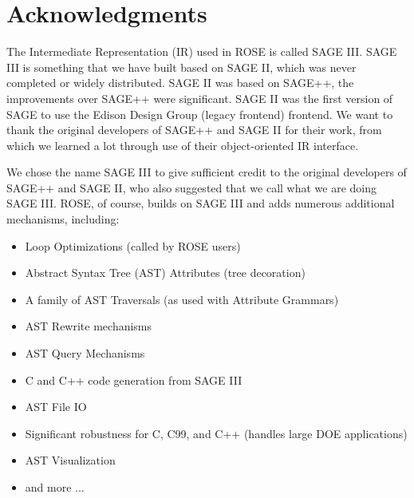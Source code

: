 
\chapter*{Acknowledgments}

% 
% 

   The Intermediate Representation (IR) used in ROSE is called SAGE III.
SAGE III is something that we have built based on SAGE II, which was never 
completed or widely distributed. SAGE II was based on SAGE++, the improvements 
over SAGE++ were significant. SAGE II was the first version of SAGE to use the 
Edison Design Group (legacy frontend) frontend.  We want to thank the original
developers of SAGE++ and SAGE II for their work, from which we learned a lot
through use of their object-oriented IR interface.

   We chose the name SAGE III to give sufficient credit to the original developers
of SAGE++ and SAGE II, who also suggested that we call what we are doing SAGE III.  
ROSE, of course, builds on SAGE III and adds numerous additional mechanisms, 
including:
\begin{itemize}
    \item Loop Optimizations (called by ROSE users)
    \item Abstract Syntax Tree (AST) Attributes (tree decoration)
    \item A family of AST Traversals (as used with Attribute Grammars)
    \item AST Rewrite mechanisms
    \item AST Query Mechanisms
    \item C and C++ code generation from SAGE III
    \item AST File I\/O
    \item Significant robustness for C, C99, and C++ (handles large DOE applications)
    \item AST Visualization
    \item and more ...
\end{itemize}

